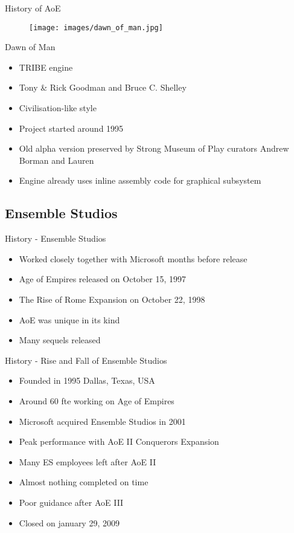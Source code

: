 \documentclass{beamer}
\begin{document}
\begin{frame}{History of AoE}
	\begin{figure}
	\texttt{[image: images/dawn\_of\_man.jpg]}
	\end{figure}
\end{frame}


\begin{frame}{Dawn of Man}
	\begin{itemize}
		\item TRIBE engine
		\item Tony \& Rick Goodman and Bruce C. Shelley
		\item Civilisation-like style
		\item Project started around 1995
		\item Old alpha version preserved by Strong Museum of Play curators Andrew Borman and Lauren
		\item Engine already uses inline assembly code for graphical subsystem
	\end{itemize}
\end{frame}


\subsection{Ensemble Studios}

\begin{frame}{History - Ensemble Studios}
	\begin{itemize}
		\item Worked closely together with Microsoft months before release
		\item Age of Empires released on October 15, 1997
		\item The Rise of Rome Expansion on October 22, 1998
		\item AoE was unique in its kind
		\item Many sequels released
	\end{itemize}
\end{frame}


\begin{frame}{History - Rise and Fall of Ensemble Studios}
	\begin{itemize}
		\item Founded in 1995 Dallas, Texas, USA
		\item Around 60 fte working on Age of Empires
		\item Microsoft acquired Ensemble Studios in 2001
		\item Peak performance with AoE II Conquerors Expansion
		\item Many ES employees left after AoE II
		\item Almost nothing completed on time
		\item Poor guidance after AoE III
		\item Closed on january 29, 2009
	\end{itemize}
\end{frame}
\end{document}
